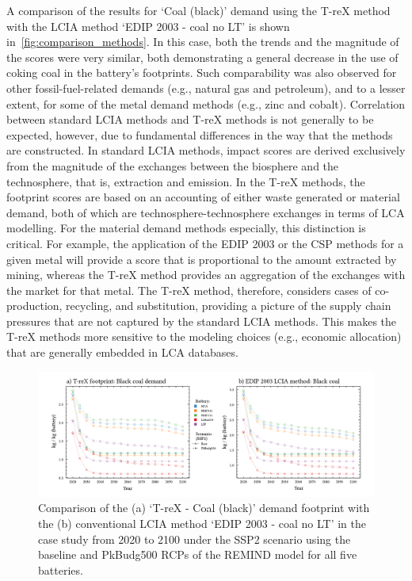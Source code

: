 \documentclass[a4paper,fleqn]{cas-dc}
\begin{document}
A comparison of the results for `Coal (black)' demand using the T-reX method
with the LCIA method `EDIP 2003 - coal no LT' is shown
in~\autoref{fig:comparison_methods}. In this case, both the trends and the
magnitude of the scores were very similar, both demonstrating a general
decrease in the use of coking coal in the battery's footprints. Such
comparability was also observed for other fossil-fuel-related demands (e.g.,
natural gas and petroleum), and to a lesser extent, for some of the metal
demand methods (e.g., zinc and cobalt). Correlation between standard LCIA
methods and T-reX methods is not generally to be expected, however, due to
fundamental differences in the way that the methods are constructed. In
standard LCIA methods, impact scores are derived exclusively from the magnitude
of the exchanges between the biosphere and the technosphere, that is,
extraction and emission. In the T-reX methods, the footprint scores are based
on an accounting of either waste generated or material demand, both of which
are technosphere-technosphere exchanges in terms of LCA modelling. For the
material demand methods especially, this distinction is critical. For example,
the application of the EDIP 2003 or the CSP methods for a given metal will
provide a score that is proportional to the amount extracted by mining, whereas
the T-reX method provides an aggregation of the exchanges with the market for
that metal. The T-reX method, therefore, considers cases of co-production,
recycling, and substitution, providing a picture of the supply chain pressures
that are not captured by the standard LCIA methods. This makes the T-reX
methods more sensitive to the modeling choices (e.g., economic allocation) that
are generally embedded in LCA databases.

\begin{figure}
	\centering
	\includegraphics[width=1.8\columnwidth]{figures/T-reX-coalANDedip.pdf}
	\caption{Comparison of the (a) `T-reX - Coal (black)' demand footprint with the (b) conventional LCIA method `EDIP 2003 - coal no LT'  in the case study from 2020 to 2100 under the SSP2 scenario using the baseline and PkBudg500 RCPs of the REMIND model for all five batteries.}\label{fig:comparison_methods}
\end{figure}
\end{document}
